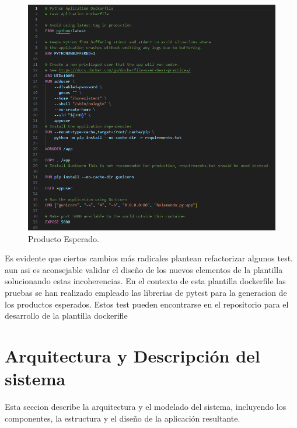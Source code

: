 \documentclass[12pt, a4paper, twoside]{article}
\begin{document}
\begin{figure}[h]
	\centering
	  \includegraphics[width=1\textwidth]{dockerfile.backend.producto.png}
	\caption{Producto Esperado.}
\end{figure}

Es evidente que ciertos cambios más radicales plantean refactorizar algunos test. aun asi es aconsejable validar el diseño de los nuevos elementos de la plantilla solucionando estas incoherencias.
En el contexto de esta plantilla dockerfile las pruebas se han realizado empleado las librerias de pytest \cite{pytest_docs} para la generacion de los productos esperados. Estos test pueden encontrarse en el repositorio para el desarrollo de la plantilla dockerifle \cite{dockerfile_template_dev}

















\section{Arquitectura y Descripción del sistema }
\label{sec:Arquitectura y Descripción del sistema}
Esta seccion describe la arquitectura y el modelado del sistema, incluyendo los componentes, la estructura y el diseño de la aplicación resultante.
\end{document}
